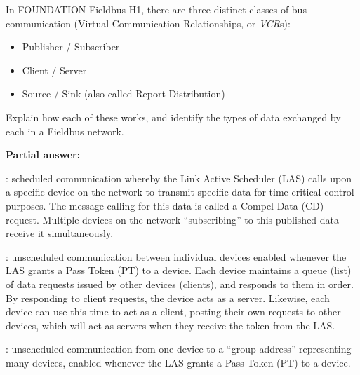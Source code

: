 

In FOUNDATION Fieldbus H1, there are three distinct classes of bus communication (Virtual Communication Relationships, or {\it VCR}s):

\begin{itemize}
\item{} Publisher / Subscriber
\item{} Client / Server
\item{} Source / Sink (also called Report Distribution)
\end{itemize}

Explain how each of these works, and identify the types of data exchanged by each in a Fieldbus network.







\noindent
{\bf Partial answer:}

: scheduled communication whereby the Link Active Scheduler (LAS) calls upon a specific device on the network to transmit specific data for time-critical control purposes.  The message calling for this data is called a Compel Data (CD) request.  Multiple devices on the network ``subscribing'' to this published data receive it simultaneously.

\vskip 10pt

: unscheduled communication between individual devices enabled whenever the LAS grants a Pass Token (PT) to a device.  Each device maintains a queue (list) of data requests issued by other devices (clients), and responds to them in order.  By responding to client requests, the device acts as a server.  Likewise, each device can use this time to act as a client, posting their own requests to other devices, which will act as servers when they receive the token from the LAS.

\vskip 10pt

: unscheduled communication from one device to a ``group address'' representing many devices, enabled whenever the LAS grants a Pass Token (PT) to a device. 






